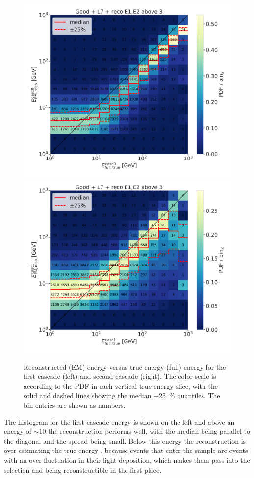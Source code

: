 \begin{figure}[h]
	\centering
    \includegraphics[width=0.49\linewidth]{figures/results/190607/resolutions/190607_millipede_level_no_NaNs_NEW_flipped_casc0_reco_energy_vs_casc0_true_energy_reco_above3_step_contours.png}
    \includegraphics[width=0.49\linewidth]{figures/results/190607/resolutions/190607_millipede_level_no_NaNs_NEW_flipped_casc1_reco_energy_vs_casc1_true_energy_reco_above3_step_contours.png}
    \caption[Preliminary two-dimensional reconstructed versus true cascade energy resolutions]{Reconstructed (EM) energy versus true energy (full) energy for the first cascade (left) and second cascade (right). The color scale is according to the PDF in each vertical true energy slice, with the solid and dashed lines showing the median $\pm$\SI{25}{\percent} quantiles. The bin entries are shown as numbers.}
\end{figure}

The histogram for the first cascade energy is shown on the left and above an energy of $\sim$\SI{10}{\gev} the reconstruction performs well, with the median being parallel to the diagonal and the spread being small. Below this energy the reconstruction is over-estimating the true energy
, because events that enter the sample are events with an over fluctuation in their light deposition, which makes them pass into the selection and being reconstructible in the first place.


